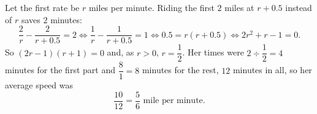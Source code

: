 Let the first rate be $r$ miles per minute. Riding the first $2$ miles at $r+0.5$ instead of $r$ saves $2$ minutes:
\[
\dfrac{2}{r}-\dfrac{2}{r+0.5}=2\iff\dfrac{1}{r}-\dfrac{1}{r+0.5}=1\iff 0.5=r(r+0.5)\iff 2r^2+r-1=0 .
\]
So $(2r-1)(r+1)=0$ and, as $r>0$, $r=\dfrac{1}{2}$. Her times were $2\div\dfrac{1}{2}=4$ minutes for the first part and $\dfrac{8}{1}=8$ minutes for the rest, $12$ minutes in all, so her average speed was
\[
\dfrac{10}{12}=\boxed{\dfrac{5}{6}}\text{ mile per minute}.
\]
